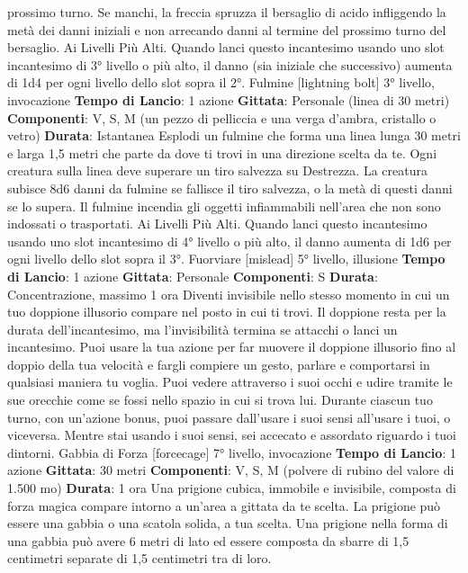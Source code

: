 \begin{multicols}{2}
prossimo turno. Se manchi, la freccia spruzza il
bersaglio di acido infliggendo la metà dei danni iniziali e
non arrecando danni al termine del prossimo turno del
bersaglio.
Ai Livelli Più Alti. Quando lanci questo incantesimo
usando uno slot incantesimo di 3° livello o più alto, il
danno (sia iniziale che successivo) aumenta di 1d4 per
ogni livello dello slot sopra il 2°.
Fulmine
[lightning bolt]
3° livello, invocazione
\textbf{Tempo di Lancio}: 1 azione
\textbf{Gittata}: Personale (linea di 30 metri)
\textbf{Componenti}: V, S, M (un pezzo di pelliccia e una
verga d’ambra, cristallo o vetro)
\textbf{Durata}: Istantanea
Esplodi un fulmine che forma una linea lunga 30 metri e
larga 1,5 metri che parte da dove ti trovi in una
direzione scelta da te.
Ogni creatura sulla linea deve superare un tiro salvezza
su Destrezza. La creatura subisce 8d6 danni da fulmine
se fallisce il tiro salvezza, o la metà di questi danni se lo
supera.
Il fulmine incendia gli oggetti infiammabili nell’area che
non sono indossati o trasportati.
Ai Livelli Più Alti. Quando lanci questo incantesimo
usando uno slot incantesimo di 4° livello o più alto, il
danno aumenta di 1d6 per ogni livello dello slot sopra il
3°.
Fuorviare
[mislead]
5° livello, illusione
\textbf{Tempo di Lancio}: 1 azione
\textbf{Gittata}: Personale
\textbf{Componenti}: S
\textbf{Durata}: Concentrazione, massimo 1 ora
Diventi invisibile nello stesso momento in cui un tuo
doppione illusorio compare nel posto in cui ti trovi. Il
doppione resta per la durata dell’incantesimo, ma
l’invisibilità termina se attacchi o lanci un incantesimo.
Puoi usare la tua azione per far muovere il doppione
illusorio fino al doppio della tua velocità e fargli
compiere un gesto, parlare e comportarsi in qualsiasi
maniera tu voglia.
Puoi vedere attraverso i suoi occhi e udire tramite le
sue orecchie come se fossi nello spazio in cui si trova
lui. Durante ciascun tuo turno, con un’azione bonus,
puoi passare dall’usare i suoi sensi all’usare i tuoi, o
viceversa. Mentre stai usando i suoi sensi, sei accecato
e assordato riguardo i tuoi dintorni.
Gabbia di Forza
[forcecage]
7° livello, invocazione
\textbf{Tempo di Lancio}: 1 azione
\textbf{Gittata}: 30 metri
\textbf{Componenti}: V, S, M (polvere di rubino del valore di
1.500 mo)
\textbf{Durata}: 1 ora
Una prigione cubica, immobile e invisibile, composta di
forza magica compare intorno a un’area a gittata da te
scelta. La prigione può essere una gabbia o una scatola
solida, a tua scelta.
Una prigione nella forma di una gabbia può avere 6
metri di lato ed essere composta da sbarre di 1,5
centimetri separate di 1,5 centimetri tra di loro.

\end{multicols}
